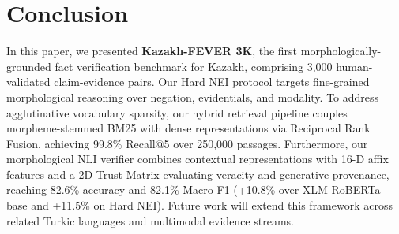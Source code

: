 \section{Conclusion}
\label{sec:conclusion}

In this paper, we presented \textbf{Kazakh-FEVER 3K}, the first morphologically-grounded fact verification benchmark for Kazakh, comprising 3,000 human-validated claim-evidence pairs. Our Hard NEI protocol targets fine-grained morphological reasoning over negation, evidentials, and modality. To address agglutinative vocabulary sparsity, our hybrid retrieval pipeline couples morpheme-stemmed BM25 with dense representations via Reciprocal Rank Fusion, achieving 99.8\% Recall@5 over 250,000 passages. Furthermore, our morphological NLI verifier combines contextual representations with 16-D affix features and a 2D Trust Matrix evaluating veracity and generative provenance, reaching 82.6\% accuracy and 82.1\% Macro-F1 (+10.8\% over XLM-RoBERTa-base and +11.5\% on Hard NEI). Future work will extend this framework across related Turkic languages and multimodal evidence streams.
